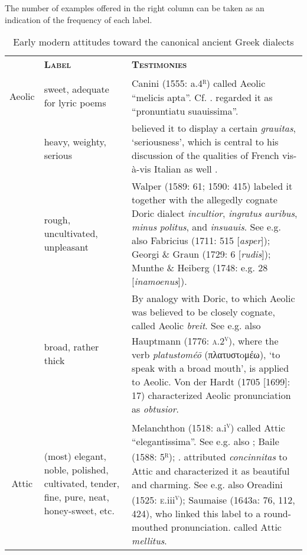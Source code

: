 \begin{table}
\caption{Early modern attitudes toward the canonical ancient Greek dialects} 

The number of examples offered in the right column can be taken as an indication of the frequency of each label.

 
\begin{tabularx}{\textwidth}{XXX}
\lsptoprule

\multicolumn{1}{c}{\textbf{\textsc{Dialect}}} & \textbf{\textsc{Label}} & \textbf{\textsc{Testimonies}}\\
\multicolumn{1}{c}{Aeolic} & sweet, adequate for lyric poems & Canini (1555: a.4\textsc{\textsuperscript{r}}) called Aeolic “melicis apta”. Cf. \citet[103]{Hoius1620}. \citet[106]{Giraudeau1739} regarded it as “pronuntiatu suauissima”.\\
& heavy, weighty, serious & \citet[16]{Estienne1581} believed it to display a certain \textit{grauitas}, ‘seriousness’, which is central to his discussion of the qualities of French vis-à-vis Italian as well \citep[71]{Swiggers2009}.\\
 & rough, uncultivated, unpleasant & Walper (1589: 61; 1590: 415) labeled it together with the allegedly cognate Doric dialect \textit{incultior}, \textit{ingratus} \textit{auribus}, \textit{minus} \textit{politus}, and \textit{insuauis}. See e.g. also Fabricius (1711: 515 [\textit{asper}]); Georgi \& Graun (1729: 6 [\textit{rudis}]); Munthe \& Heiberg (1748: e.g. 28 [\textit{inamoenus}]).\\
 & broad, rather thick & By analogy with Doric, to which Aeolic was believed to be closely cognate, \citet[582]{Nibbe1725} called Aeolic \textit{breit}. See e.g. also Hauptmann (1776: \textsc{a.2}\textsc{\textsuperscript{v}}), where the verb \textit{platustoméo\={} } (πλατυστoμέω), ‘to speak with a broad mouth’, is applied to Aeolic. Von der Hardt (1705 [1699]: 17) characterized Aeolic pronunciation as \textit{obtusior}.\\
\multicolumn{1}{c}{Attic} & (most) elegant, noble, polished, cultivated, tender, fine, pure, neat, honey-sweet, etc. & Melanchthon (1518: a.i\textsc{\textsuperscript{v}}) called Attic “elegantissima”. See e.g. also \citet[209]{Vergara1537}; Baile (1588: 5\textsc{\textsuperscript{r}}); \citet[334]{Alsted1630}. \citet[226]{Ruland1556} attributed \textit{concinnitas} to Attic and characterized it as beautiful and charming. See e.g. also Oreadini (1525: \textsc{e}.iii\textsc{\textsuperscript{v}}); Saumaise (1643a: 76, 112, 424), who linked this label to a round-mouthed pronunciation. \citet[96]{Hoius1620} called Attic \textit{mellitus}.\\

\end{tabularx}
\end{table}
